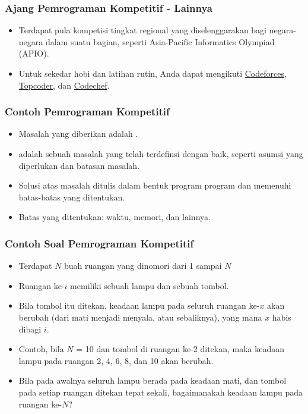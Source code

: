 \begin{frame}
\frametitle{Ajang Pemrograman Kompetitif - Lainnya}
\begin{itemize}
  \item Terdapat pula kompetisi tingkat regional yang diselenggarakan bagi negara-negara dalam suatu bagian, seperti Asia-Pacific Informatics Olympiad (APIO).
  \item Untuk sekedar hobi dan latihan rutin, Anda dapat mengikuti \textcolor{blue}{\href{http://codeforces.com/}{Codeforces}}, \textcolor{blue}{\href{https://www.topcoder.com/}{Topcoder}}, dan \textcolor{blue}{\href{https://www.codechef.com/}{Codechef}}.
\end{itemize}
\end{frame}

\begin{frame}
\frametitle{Contoh Pemrograman Kompetitif}
\begin{itemize}
  \item Masalah yang diberikan adalah .
  \item {} adalah sebuah masalah yang telah terdefinsi dengan baik, seperti asumsi yang diperlukan dan batasan masalah.
  \item Solusi atas masalah ditulis dalam bentuk program program dan memenuhi batas-batas yang ditentukan.
  \item Batas yang ditentukan: waktu, memori, dan lainnya.
\end{itemize}
\end{frame}

\begin{frame}
\frametitle{Contoh Soal Pemrograman Kompetitif}
\begin{itemize}
  \item Terdapat $N$ buah ruangan yang dinomori dari 1 sampai $N$
  \item Ruangan ke-$i$ memiliki sebuah lampu dan sebuah tombol.
  \item Bila tombol itu ditekan, keadaan lampu pada seluruh ruangan ke-$x$ akan berubah (dari mati menjadi menyala, atau sebaliknya), yang mana $x$ habis dibagi $i$.
  \item Contoh, bila $N$ = 10 dan tombol di ruangan ke-2 ditekan, maka keadaan lampu pada ruangan 2, 4, 6, 8, dan 10 akan berubah.
  \item Bila pada awalnya seluruh lampu berada pada keadaan mati, dan tombol pada setiap ruangan ditekan tepat sekali, bagaimanakah keadaan lampu pada ruangan ke-$N$?
\end{itemize}
\end{frame}

